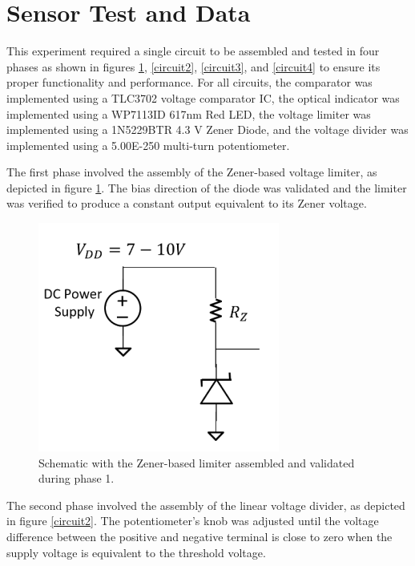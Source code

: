 \documentclass[conference]{IEEEtran}
\begin{document}
\section{Sensor Test and Data}

This experiment required a single circuit to be assembled and tested in four phases as shown in figures \ref{circuit1}, \ref{circuit2},  \ref{circuit3}, and \ref{circuit4} to ensure its proper functionality and performance. For all circuits, the comparator was implemented using a TLC3702 voltage comparator IC, the optical indicator was implemented using a WP7113ID 617nm Red LED, the voltage limiter was implemented using a 1N5229BTR 4.3 V Zener Diode, and the voltage divider was implemented using a 5.00E-250 multi-turn potentiometer.

The first phase involved the assembly of the Zener-based voltage limiter, as depicted in figure \ref{circuit1}. The bias direction of the diode was validated and the limiter was verified to produce a constant output equivalent to its Zener voltage.

\begin{figure}[htbp]
\centerline{\includegraphics{./images/circuit1.png}}
\caption{Schematic with the Zener-based limiter assembled and validated during phase 1. \cite{week7}}
\label{circuit1}
\end{figure}

The second phase involved the assembly of the linear voltage divider, as depicted in figure \ref{circuit2}. The potentiometer's knob was adjusted until the voltage difference between the positive and negative terminal is close to zero when the supply voltage is equivalent to the threshold voltage.
\end{document}
